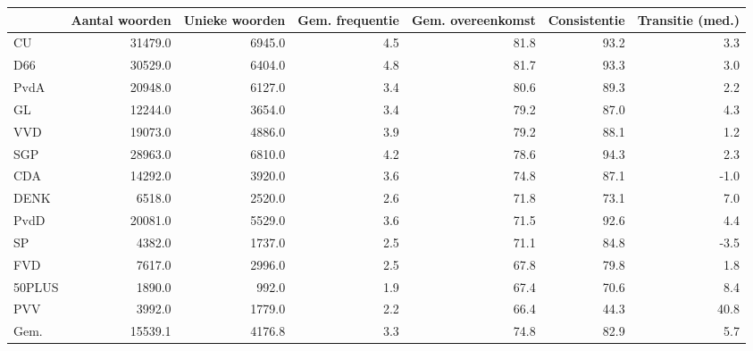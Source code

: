\begin{tabular}{lrrrrrr}
\toprule
{} &  Aantal woorden &  Unieke woorden &  Gem. frequentie &  Gem. overeenkomst &  Consistentie &  Transitie (med.) \\
\midrule
CU     &         31479.0 &          6945.0 &              4.5 &               81.8 &          93.2 &               3.3 \\
D66    &         30529.0 &          6404.0 &              4.8 &               81.7 &          93.3 &               3.0 \\
PvdA   &         20948.0 &          6127.0 &              3.4 &               80.6 &          89.3 &               2.2 \\
GL     &         12244.0 &          3654.0 &              3.4 &               79.2 &          87.0 &               4.3 \\
VVD    &         19073.0 &          4886.0 &              3.9 &               79.2 &          88.1 &               1.2 \\
SGP    &         28963.0 &          6810.0 &              4.2 &               78.6 &          94.3 &               2.3 \\
CDA    &         14292.0 &          3920.0 &              3.6 &               74.8 &          87.1 &              -1.0 \\
DENK   &          6518.0 &          2520.0 &              2.6 &               71.8 &          73.1 &               7.0 \\
PvdD   &         20081.0 &          5529.0 &              3.6 &               71.5 &          92.6 &               4.4 \\
SP     &          4382.0 &          1737.0 &              2.5 &               71.1 &          84.8 &              -3.5 \\
FVD    &          7617.0 &          2996.0 &              2.5 &               67.8 &          79.8 &               1.8 \\
50PLUS &          1890.0 &           992.0 &              1.9 &               67.4 &          70.6 &               8.4 \\
PVV    &          3992.0 &          1779.0 &              2.2 &               66.4 &          44.3 &              40.8 \\
Gem.   &         15539.1 &          4176.8 &              3.3 &               74.8 &          82.9 &               5.7 \\
\bottomrule
\end{tabular}

